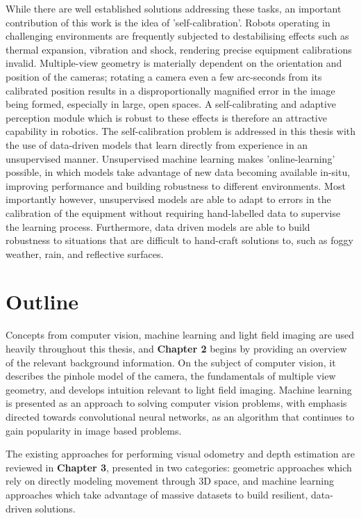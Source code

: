 \documentclass[openany]{book}
\begin{document}
While there are well established solutions addressing these tasks, an important contribution of this work is the idea of 'self-calibration'. Robots operating in challenging environments are frequently subjected to destabilising effects such as thermal expansion, vibration and shock, rendering precise equipment calibrations invalid. Multiple-view geometry is materially dependent on the orientation and position of the cameras; rotating a camera even a few arc-seconds from its calibrated position results in a disproportionally magnified error in the image being formed, especially in large, open spaces. A self-calibrating and adaptive perception module which is robust to these effects is therefore an attractive capability in robotics. The self-calibration problem is addressed in this thesis with the use of data-driven models that learn directly from experience in an unsupervised manner. Unsupervised machine learning makes 'online-learning' possible, in which models take advantage of new data becoming available in-situ, improving performance and building robustness to different environments. Most importantly however, unsupervised models are able to adapt to errors in the calibration of the equipment without requiring hand-labelled data to supervise the learning process. Furthermore, data driven models are able to build robustness to situations that are difficult to hand-craft solutions to, such as foggy weather, rain, and reflective surfaces.

\section{Outline}
Concepts from computer vision, machine learning and light field imaging are used heavily throughout this thesis, and \textbf{Chapter 2} begins by providing an overview of the relevant background information. On the subject of computer vision, it describes the pinhole model of the camera, the fundamentals of multiple view geometry, and develops intuition relevant to light field imaging. Machine learning is presented as an approach to solving computer vision problems, with emphasis directed towards convolutional neural networks, as an algorithm that continues to gain popularity in image based problems.

The existing approaches for performing visual odometry and depth estimation are reviewed in \textbf{Chapter 3}, presented in two categories: geometric approaches which rely on directly modeling movement through 3D space, and machine learning approaches which take advantage of massive datasets to build resilient, data-driven solutions.
\end{document}
